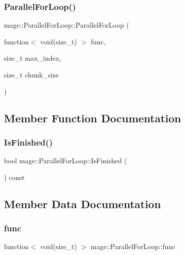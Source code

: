 \subsubsection{\texorpdfstring{Parallel\+For\+Loop()}{ParallelForLoop()}}
{\footnotesize\ttfamily mage\+::\+Parallel\+For\+Loop\+::\+Parallel\+For\+Loop (\begin{DoxyParamCaption}\item[{function$<$ void(size\+\_\+t) $>$}]{func,  }\item[{size\+\_\+t}]{max\+\_\+index,  }\item[{size\+\_\+t}]{chunk\+\_\+size }\end{DoxyParamCaption})}



\subsection{Member Function Documentation}
\hypertarget{classmage_1_1_parallel_for_loop_a6ca9c77ef5475a0df0f742f2301d2d40}{}\label{classmage_1_1_parallel_for_loop_a6ca9c77ef5475a0df0f742f2301d2d40} 
\subsubsection{\texorpdfstring{Is\+Finished()}{IsFinished()}}
{\footnotesize\ttfamily bool mage\+::\+Parallel\+For\+Loop\+::\+Is\+Finished (\begin{DoxyParamCaption}{ }\end{DoxyParamCaption}) const}



\subsection{Member Data Documentation}
\hypertarget{classmage_1_1_parallel_for_loop_a3651892e12fc6cdf87b7c74ffe68e82c}{}\label{classmage_1_1_parallel_for_loop_a3651892e12fc6cdf87b7c74ffe68e82c} 
\subsubsection{\texorpdfstring{func}{func}}
{\footnotesize\ttfamily function$<$ void(size\+\_\+t) $>$ mage\+::\+Parallel\+For\+Loop\+::func}


